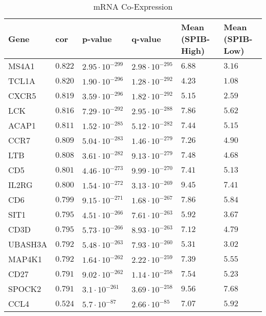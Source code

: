 \begin{table}[!p]
    \centering
    \caption{mRNA Co-Expression}
    \begin{center}
    \begin{tabular}{l|lllll}
        Gene	&	cor	&	p-value	&	q-value	&	Mean (SPIB-High)	&	Mean (SPIB-Low) \\ \hline
        MS4A1	&	$0.822$	&	$2.95 \cdot 10^{-299}$	&	$2.98 \cdot 10^{-295}$	&	$6.88$	&	$3.16$\\ 
        TCL1A	&	$0.820$	&	$1.90 \cdot 10^{-296}$	&	$1.28 \cdot 10^{-292}$	&	$4.23$	&	$1.08$\\ 
        CXCR5	&	$0.819$	&	$3.59 \cdot 10^{-296}$	&	$1.82 \cdot 10^{-292}$	&	$5.15$	&	$2.59$\\ 
        LCK	    &	$0.816$	&	$7.29 \cdot 10^{-292}$	&	$2.95 \cdot 10^{-288}$	&	$7.86$	&	$5.62$\\ 
        ACAP1	&	$0.811$	&	$1.52 \cdot 10^{-285}$	&	$5.12 \cdot 10^{-282}$	&	$7.44$	&	$5.15$\\ 
        CCR7	&	$0.809$	&	$5.04 \cdot 10^{-283}$	&	$1.46 \cdot 10^{-279}$	&	$7.26$	&	$4.90$\\ 
        LTB	    &	$0.808$	&	$3.61 \cdot 10^{-282}$	&	$9.13 \cdot 10^{-279}$	&	$7.48$	&	$4.68$\\ 
        CD5	    &	$0.801$	&	$4.46 \cdot 10^{-273}$	&	$9.99 \cdot 10^{-270}$	&	$7.41$	&	$5.13$\\ 
        IL2RG	&	$0.800$	&	$1.54 \cdot 10^{-272}$	&	$3.13 \cdot 10^{-269}$	&	$9.45$	&	$7.41$\\ 
        CD6	    &	$0.799$	&	$9.15 \cdot 10^{-271}$	&	$1.68 \cdot 10^{-267}$	&	$7.86$	&	$5.84$\\ 
        SIT1	&	$0.795$	&	$4.51 \cdot 10^{-266}$	&	$7.61 \cdot 10^{-263}$	&	$5.92$	&	$3.67$\\ 
        CD3D	&	$0.795$	&	$5.73 \cdot 10^{-266}$	&	$8.93 \cdot 10^{-263}$	&	$7.12$	&	$4.79$\\ 
        UBASH3A	&	$0.792$	&	$5.48 \cdot 10^{-263}$	&	$7.93 \cdot 10^{-260}$	&	$5.31$	&	$3.02$\\ 
        MAP4K1	&	$0.792$	&	$1.64 \cdot 10^{-262}$	&	$2.22 \cdot 10^{-259}$	&	$7.39$	&	$5.55$\\ 
        CD27	&	$0.791$	&	$9.02 \cdot 10^{-262}$	&	$1.14 \cdot 10^{-258}$	&	$7.54$	&	$5.23$\\ 
        SPOCK2	&	$0.791$	&	$3.1\cdot 10^{-261}$	&	$3.69 \cdot 10^{-258}$	&	$9.56$	&	$7.68$\\ 
        CCL4	&	$0.524$	&	$5.7\cdot 10^{-87}$	    &	$2.66 \cdot 10^{-85}$	&	$7.07$	&	$5.92$\\ \hline

\end{tabular}
\end{center}
\end{table}
